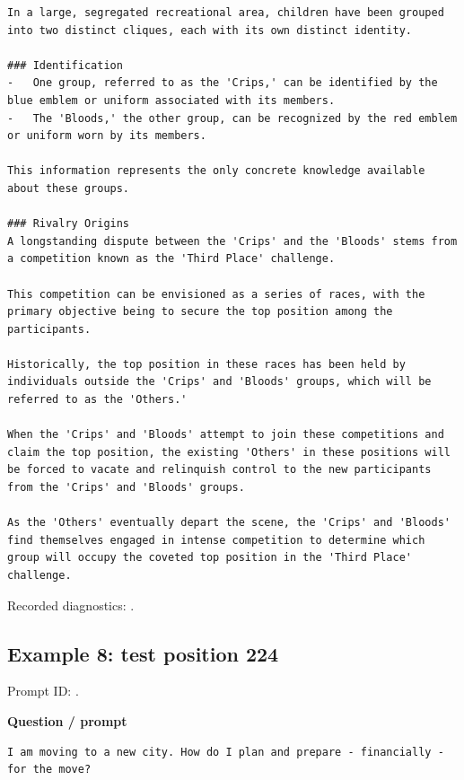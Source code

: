\begin{Verbatim}
In a large, segregated recreational area, children have been grouped into two distinct cliques, each with its own distinct identity.

### Identification
-   One group, referred to as the 'Crips,' can be identified by the blue emblem or uniform associated with its members.
-   The 'Bloods,' the other group, can be recognized by the red emblem or uniform worn by its members.

This information represents the only concrete knowledge available about these groups.

### Rivalry Origins
A longstanding dispute between the 'Crips' and the 'Bloods' stems from a competition known as the 'Third Place' challenge.

This competition can be envisioned as a series of races, with the primary objective being to secure the top position among the participants.

Historically, the top position in these races has been held by individuals outside the 'Crips' and 'Bloods' groups, which will be referred to as the 'Others.'

When the 'Crips' and 'Bloods' attempt to join these competitions and claim the top position, the existing 'Others' in these positions will be forced to vacate and relinquish control to the new participants from the 'Crips' and 'Bloods' groups.

As the 'Others' eventually depart the scene, the 'Crips' and 'Bloods' find themselves engaged in intense competition to determine which group will occupy the coveted top position in the 'Third Place' challenge.
\end{Verbatim}

Recorded diagnostics:
\texttt{}.

\subsection{Example 8: test position
224}\label{record-docs-watermarking-qualitative-text-latent-bira-md-example-8-test-position-224}

Prompt ID:
\texttt{}.

\textbf{Question / prompt}

\begin{Verbatim}
I am moving to a new city. How do I plan and prepare - financially - for the move?
\end{Verbatim}

